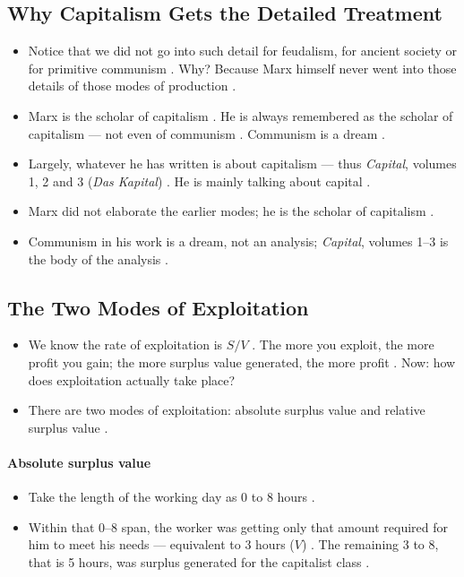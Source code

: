 \subsection{Why Capitalism Gets the Detailed Treatment}
\begin{itemize}
    \item Notice that we did not go into such detail for feudalism, for ancient society or for primitive communism . Why? Because Marx himself never went into those details of those modes of production .
    \item Marx is the scholar of capitalism . He is always remembered as the scholar of capitalism --- not even of communism . Communism is a dream .
    \item Largely, whatever he has written is about capitalism --- thus \emph{Capital}, volumes 1, 2 and 3 (\emph{Das Kapital}) . He is mainly talking about capital .
\end{itemize}

\begin{QuickRevision}
\begin{itemize}
    \item Marx did not elaborate the earlier modes; he is the scholar of capitalism .
    \item Communism in his work is a dream, not an analysis; \emph{Capital}, volumes 1--3 is the body of the analysis .
\end{itemize}
\end{QuickRevision}

\subsection{The Two Modes of Exploitation}
\begin{itemize}
    \item We know the rate of exploitation is $S/V$ . The more you exploit, the more profit you gain; the more surplus value generated, the more profit . Now: how does exploitation actually take place? 
    \item There are two modes of exploitation: absolute surplus value and relative surplus value .
\end{itemize}

\paragraph{Absolute surplus value}
\begin{itemize}
    \item Take the length of the working day as 0 to 8 hours .
    \item Within that 0--8 span, the worker was getting only that amount required for him to meet his needs --- equivalent to 3 hours ($V$) . The remaining 3 to 8, that is 5 hours, was surplus generated for the capitalist class .
\end{itemize}

